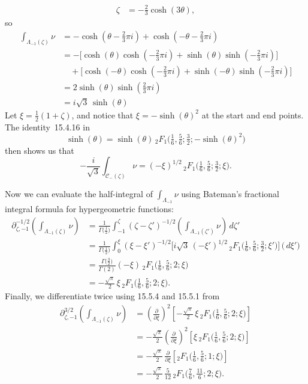 \documentclass{article}
\newcommand{\fracderiv}[3]{\partial^{#1}_{#2, #3}}
\theoremstyle{definition}
\theoremstyle{plain}
\begin{document}
{\begin{align*}
\zeta & = -\tfrac{2}{3} \cosh(3\theta),
\end{align*}
so
\begin{align*}
\int_{\Lambda_{-1}(\zeta)} \nu & =- \cosh(\theta - \tfrac{2}{3}\pi i) + \cosh(-\theta - \tfrac{2}{3}\pi i) \\
& =- \big[\cosh(\theta) \cosh(-\tfrac{2}{3}\pi i) + \sinh(\theta) \sinh(-\tfrac{2}{3}\pi i)\big] \\
& \quad + \big[\cosh(-\theta) \cosh(-\tfrac{2}{3}\pi i) + \sinh(-\theta) \sinh(-\tfrac{2}{3}\pi i)\big] \\
& = 2\sinh(\theta) \sinh(\tfrac{2}{3}\pi i) \\
& = i\sqrt{3}\,\sinh(\theta)
\end{align*}
Let $\xi = \tfrac{1}{2}(1 + \zeta)$, and notice that $\xi =- \sinh( \theta)^2$ at the start and end points. The identity~15.4.16 in \cite{dlmf}
\[ \sinh(\theta) = \sinh(\theta)\, {}_2F_1\big(\tfrac{1}{6}, \tfrac{5}{6}; \tfrac{3}{2}; -\sinh(\theta)^2\big) \]
then shows us that
\[ -\frac{i}{\sqrt{3}} \int_{\mathcal{C}_-(\zeta)} \nu =  (-\xi)^{1/2}\, {}_2F_1\big(\tfrac{1}{6}, \tfrac{5}{6}; \tfrac{3}{2}; \xi\big). \]

Now we can evaluate the half-integral of $\int_{\Lambda_{-1}} \nu$ using Bateman's fractional integral formula for hypergeometric functions: \begin{align*}
\fracderiv{-1/2}{\zeta}{-1}\left( \int_{\Lambda_{-1}(\zeta)} \nu \right) & = \frac{1}{\Gamma\big(\tfrac{1}{2}\big)} \int_{-1}^\zeta (\zeta - \zeta')^{-1/2} \left( \int_{\Lambda_{-1}(\zeta')} \nu \right)\,d\zeta' \\
& = \frac{1}{\Gamma\big(\tfrac{1}{2}\big)} \int_0^\xi  (\xi - \xi')^{-1/2} \Big[{i}{\sqrt{3}}\, (-\xi')^{1/2}\, {}_2F_1\big(\tfrac{1}{6}, \tfrac{5}{6}; \tfrac{3}{2}; \xi' \big) \Big] \,\big( \,d\xi' \big) \\
& =  \frac{\Gamma\big(\tfrac{3}{2}\big)}{\Gamma(2)} (-\xi)\, {}_2F_1\big(\tfrac{1}{6}, \tfrac{5}{6}; 2; \xi\big) \\
& = - \tfrac{\sqrt{\pi}}{2}\,\xi\,{}_2F_1\big(\tfrac{1}{6}, \tfrac{5}{6}; 2; \xi\big).
\end{align*}
Finally, we differentiate twice using 15.5.4 and 15.5.1 from \cite{dlmf}
\begin{align*}
\fracderiv{3/2}{\zeta}{-1} \left( \int_{\Lambda_{-1}(\zeta)} \nu \right) & = \left(\tfrac{\partial}{\partial \xi}\right)^2 \left[ - \tfrac{\sqrt{\pi}}{2} \,\xi\, {}_2F_1\big(\tfrac{1}{6}, \tfrac{5}{6}; 2; \xi\big) \right] \\
& = - \tfrac{\sqrt{\pi}}{2} \left(\tfrac{\partial}{\partial \xi}\right)^2 \left[ \xi\, {}_2F_1\big(\tfrac{1}{6}, \tfrac{5}{6}; 2; \xi\big) \right] \\
& = - \tfrac{\sqrt{\pi}}{2}\,\tfrac{\partial}{\partial \xi} \left[ {}_2F_1\big(\tfrac{1}{6}, \tfrac{5}{6}; 1; \xi\big) \right] \\
& = - \tfrac{\sqrt{\pi}}{2}\,\tfrac{5}{12}\, {}_2F_1\big(\tfrac{7}{6}, \tfrac{11}{6}; 2; \xi\big).
\end{align*}
}
\end{document}
